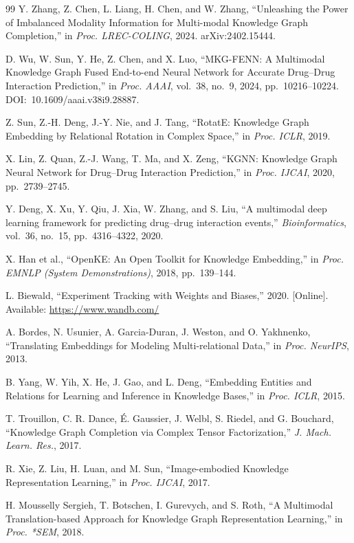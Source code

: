 \documentclass[conference]{IEEEtran}
\begin{document}
\begin{thebibliography}{99}
Y. Zhang, Z. Chen, L. Liang, H. Chen, and W. Zhang,
``Unleashing the Power of Imbalanced Modality Information for Multi-modal
Knowledge Graph Completion,'' in \emph{Proc. LREC-COLING}, 2024.
arXiv:2402.15444.

D. Wu, W. Sun, Y. He, Z. Chen, and X. Luo,
``MKG-FENN: A Multimodal Knowledge Graph Fused End-to-end Neural Network for
Accurate Drug--Drug Interaction Prediction,'' in \emph{Proc. AAAI}, vol.~38,
no.~9, 2024, pp.~10216--10224. DOI:~10.1609/aaai.v38i9.28887.

Z. Sun, Z.-H. Deng, J.-Y. Nie, and J. Tang,
``RotatE: Knowledge Graph Embedding by Relational Rotation in Complex Space,''
in \emph{Proc. ICLR}, 2019.

X. Lin, Z. Quan, Z.-J. Wang, T. Ma, and X. Zeng,
``KGNN: Knowledge Graph Neural Network for Drug--Drug Interaction Prediction,''
in \emph{Proc. IJCAI}, 2020, pp.~2739--2745.

Y. Deng, X. Xu, Y. Qiu, J. Xia, W. Zhang, and S. Liu,
``A multimodal deep learning framework for predicting drug--drug interaction
events,'' \emph{Bioinformatics}, vol.~36, no.~15, pp.~4316--4322, 2020.

X. Han et al.,
``OpenKE: An Open Toolkit for Knowledge Embedding,''
in \emph{Proc. EMNLP (System Demonstrations)}, 2018, pp.~139--144.

L. Biewald,
``Experiment Tracking with Weights and Biases,'' 2020. [Online].
Available: \url{https://www.wandb.com/}

A. Bordes, N. Usunier, A. Garcia-Duran, J. Weston, and O. Yakhnenko, ``Translating Embeddings for
Modeling Multi-relational Data,'' in \emph{Proc. NeurIPS}, 2013.

B. Yang, W. Yih, X. He, J. Gao, and L. Deng, ``Embedding Entities and Relations for Learning and
Inference in Knowledge Bases,'' in \emph{Proc. ICLR}, 2015.

T. Trouillon, C. R. Dance, É. Gaussier, J. Welbl, S. Riedel, and G. Bouchard, ``Knowledge Graph
Completion via Complex Tensor Factorization,'' \emph{J. Mach. Learn. Res.}, 2017.

R. Xie, Z. Liu, H. Luan, and M. Sun, ``Image-embodied Knowledge Representation Learning,'' in
\emph{Proc. IJCAI}, 2017.

H. Mousselly Sergieh, T. Botschen, I. Gurevych, and S. Roth, ``A Multimodal Translation-based
Approach for Knowledge Graph Representation Learning,'' in \emph{Proc. *SEM}, 2018.


\end{thebibliography}
\end{document}
